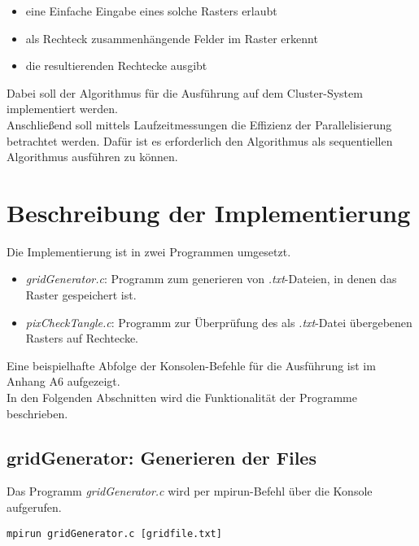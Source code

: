 \documentclass[
10pt, %
a4paper, %
oneside, %
headinclude,footinclude, %
BCOR5mm, %
]{scrartcl}
\begin{document}
\begin{itemize}[noitemsep] %
	\item eine Einfache Eingabe eines solche Rasters erlaubt
	\item als Rechteck zusammenhängende Felder im Raster erkennt 
	\item die resultierenden Rechtecke ausgibt
\end{itemize}

Dabei soll der Algorithmus für die Ausführung auf dem Cluster-System implementiert werden.\\
Anschließend soll mittels Laufzeitmessungen die Effizienz der Parallelisierung betrachtet werden. Dafür ist es erforderlich den Algorithmus als sequentiellen Algorithmus ausführen zu können.

\section{Beschreibung der Implementierung}

Die Implementierung ist in zwei Programmen umgesetzt. 

\begin{itemize}[noitemsep] %
	\item \textit{gridGenerator.c}: Programm zum generieren von \textit{.txt}-Dateien, in denen das Raster gespeichert ist.  
	\item \textit{pixCheckTangle.c}: Programm zur Überprüfung des als \textit{.txt}-Datei übergebenen Rasters auf Rechtecke.
\end{itemize}

Eine beispielhafte Abfolge der Konsolen-Befehle für die Ausführung ist im Anhang A6 aufgezeigt. \\
In den Folgenden Abschnitten wird die Funktionalität der Programme beschrieben.

\subsection{gridGenerator: Generieren der Files}

Das Programm \textit{gridGenerator.c} wird per mpirun-Befehl über die Konsole aufgerufen.\\

\begin{lstlisting}
mpirun gridGenerator.c [gridfile.txt]
\end{lstlisting}
\end{document}
